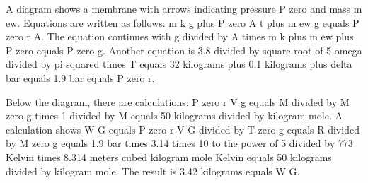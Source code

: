 A diagram shows a membrane with arrows indicating pressure P zero and mass m ew. Equations are written as follows: m k g plus P zero A t plus m ew g equals P zero r A. The equation continues with g divided by A times m k plus m ew plus P zero equals P zero g. Another equation is 3.8 divided by square root of 5 omega divided by pi squared times T equals 32 kilograms plus 0.1 kilograms plus delta bar equals 1.9 bar equals P zero r. 

Below the diagram, there are calculations: P zero r V g equals M divided by M zero g times 1 divided by M equals 50 kilograms divided by kilogram mole. A calculation shows W G equals P zero r V G divided by T zero g equals R divided by M zero g equals 1.9 bar times 3.14 times 10 to the power of 5 divided by 773 Kelvin times 8.314 meters cubed kilogram mole Kelvin equals 50 kilograms divided by kilogram mole. The result is 3.42 kilograms equals W G.